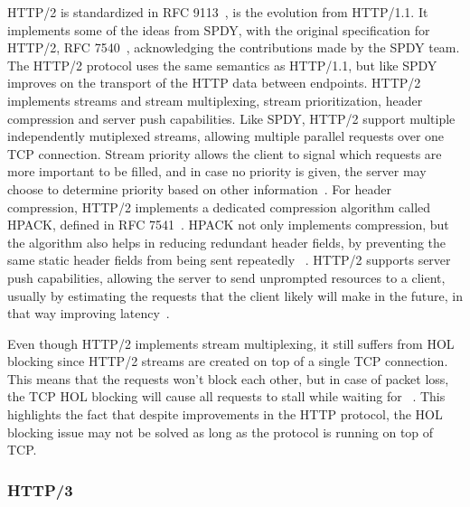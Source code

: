 \documentclass[english, 12pt, a4paper, elec, utf8, a-2b, online]{aaltothesis}
\begin{document}
HTTP/2 is standardized in RFC 9113~\cite{rfc9113}, is the evolution from HTTP/1.1.
It implements some of the ideas from SPDY, with the original specification for
HTTP/2, RFC 7540~\cite{rfc7540}, acknowledging the contributions made by the SPDY
team. The HTTP/2 protocol uses the same semantics as HTTP/1.1, but like SPDY
improves on the transport of the HTTP data between endpoints. HTTP/2 implements
streams and stream multiplexing, stream prioritization, header compression and
server push capabilities. Like SPDY, HTTP/2 support multiple independently
mutiplexed streams, allowing multiple parallel requests over one TCP connection.
Stream priority allows the client to signal which requests are more important to
be filled, and in case no priority is given, the server may choose to determine
priority based on other information~\cite{rfc9113}. For header compression, HTTP/2 implements a
dedicated compression algorithm called HPACK, defined in RFC 7541~\cite{rfc7541}.
HPACK not only implements compression, but the algorithm also helps in reducing
redundant header fields, by preventing the same static header fields from
being sent repeatedly ~\cite{rfc7541}. HTTP/2 supports server push capabilities,
allowing the server to send unprompted resources to a client, usually by estimating
the requests that the client likely will make in the future, in that way improving
latency~\cite{rfc9114}.

Even though HTTP/2 implements stream multiplexing, it still suffers from HOL blocking
since HTTP/2 streams are created on top of a single TCP
connection. This means that the requests won't block each other, but in case of
packet loss, the TCP HOL blocking will cause all requests to stall while waiting
for ~\cite{rfc9113}. This highlights the fact that despite improvements in the
HTTP protocol, the HOL blocking issue may not be solved as long as the protocol
is running on top of TCP.

\subsubsection{HTTP/3}
\end{document}
